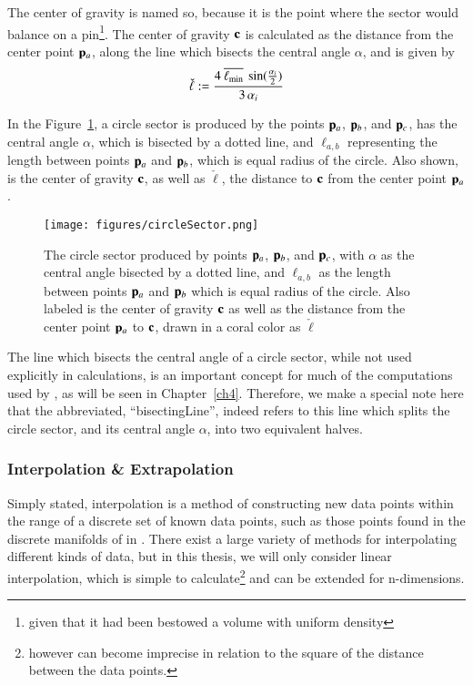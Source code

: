 The center of gravity is named so, because it is the point where the sector would balance on a pin\footnote{given that it had been bestowed a volume with uniform density}. The center of gravity $\mathbf{c}$ is calculated as the distance from the center point $\mathbf{p}_a$, along the line which bisects the central angle $\alpha$, and is given by
%
\begin{equation}
	\check{\ell} := \frac{4\:\overline{\ell_\text{min}}\:\sin(\frac{\alpha_i}{2})}{3\,\alpha_i}
	\label{eq:ch2distToCoG}
\end{equation}%
%
%

In the Figure~\ref{fig:circleSector}, a circle sector is produced by the points $\mathbf{p}_a$, $\mathbf{p}_b$, and $\mathbf{p}_c$, has the central angle $\alpha$, which is bisected by a dotted line, and $\ell_{a,b}$ representing the length between points $\mathbf{p}_a$ and $\mathbf{p}_b$, which is equal radius of the circle. Also shown, is the center of gravity $\mathbf{c}$, as well as $\check{\ell}$, the distance to $\mathbf{c}$ from the center point $\mathbf{p}_a$.

\begin{figure}[ht]
\ffigbox
	{\texttt{[image: figures/circleSector.png]}}
	{\caption[A Circle Sector in Detail]{The circle sector produced by points $\mathbf{p}_a$, $\mathbf{p}_b$, and $\mathbf{p}_c$, with $\alpha$ as the central angle bisected by a dotted line, and $\ell_{a,b}$ as the length between points $\mathbf{p}_a$ and $\mathbf{p}_b$ which is equal radius of the circle. Also labeled is the center of gravity $\mathbf{c}$ as well as the distance from the center point $\mathbf{p}_a$ to $\mathbf{c}$, drawn in a coral color as $\check{\ell}$}\label{fig:circleSector}}
\end{figure}

The line which bisects the central angle of a circle sector, while not used explicitly in calculations, is an important concept for much of the computations used by , as will be seen in Chapter~\ref{ch4}. Therefore, we make a special note here that the abbreviated, ``\gls{bisectingLine}'', indeed refers to this line which splits the circle sector, and its central angle $\alpha$, into two equivalent halves.

%
%
\subsubsection{Interpolation \& Extrapolation}
\label{ch2sETBssGsssIE}
Simply stated, interpolation is a method of constructing new data points within the range of a discrete set of known data points, such as those points found in the discrete manifolds of in \tdd{}. There exist a large variety of methods for interpolating different kinds of data, but in this thesis, we will only consider linear interpolation, which is simple to calculate\footnote{however can become imprecise in relation to the square of the distance between the data points.} and can be extended for n-dimensions.

